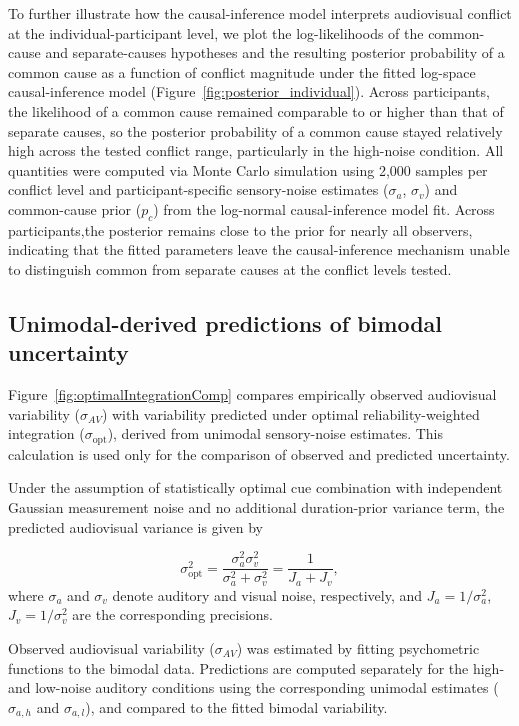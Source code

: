 \documentclass{biorxiv}
\begin{document}
To further illustrate how the causal-inference model interprets audiovisual conflict at the individual-participant level, we plot the log-likelihoods of the common-cause and separate-causes hypotheses and the resulting posterior probability of a common cause as a function of conflict magnitude under the fitted log-space causal-inference model (Figure~\ref{fig:posterior_individual}). Across participants, the likelihood of a common cause remained comparable to or higher than that of separate causes, so the posterior probability of a common cause stayed relatively high across the tested conflict range, particularly in the high-noise condition. All quantities were computed via Monte Carlo simulation using 2,000 samples per conflict level and participant-specific sensory-noise estimates ($\sigma_a$, $\sigma_v$) and common-cause prior ($p_c$) from the log-normal causal-inference model fit. Across participants,the posterior remains close to the prior for nearly all observers, indicating that the fitted parameters leave the causal-inference mechanism unable to distinguish common from separate causes at the conflict levels tested.


\subsection{Unimodal-derived predictions of bimodal uncertainty}

Figure~\ref{fig:optimalIntegrationComp} compares empirically observed audiovisual variability ($\sigma_{AV}$) with variability predicted under optimal reliability-weighted integration ($\sigma_{\mathrm{opt}}$), derived from unimodal sensory-noise estimates. This calculation is used only for the comparison of observed and predicted uncertainty.

Under the assumption of statistically optimal cue combination with independent Gaussian measurement noise and no additional duration-prior variance term, the predicted audiovisual variance is given by

\begin{equation}
\sigma_{\mathrm{opt}}^2 = \frac{\sigma_a^2 \sigma_v^2}{\sigma_a^2 + \sigma_v^2}
= \frac{1}{J_a + J_v},
\end{equation}
where $\sigma_a$ and $\sigma_v$ denote auditory and visual noise, respectively, and $J_a = 1/\sigma_a^2$, $J_v = 1/\sigma_v^2$ are the corresponding precisions.

Observed audiovisual variability ($\sigma_{AV}$) was estimated by fitting psychometric functions to the bimodal data. Predictions are computed separately for the high- and low-noise auditory conditions using the corresponding unimodal estimates ($\sigma_{a,h}$ and $\sigma_{a,l}$), and compared to the fitted bimodal variability.
\end{document}
